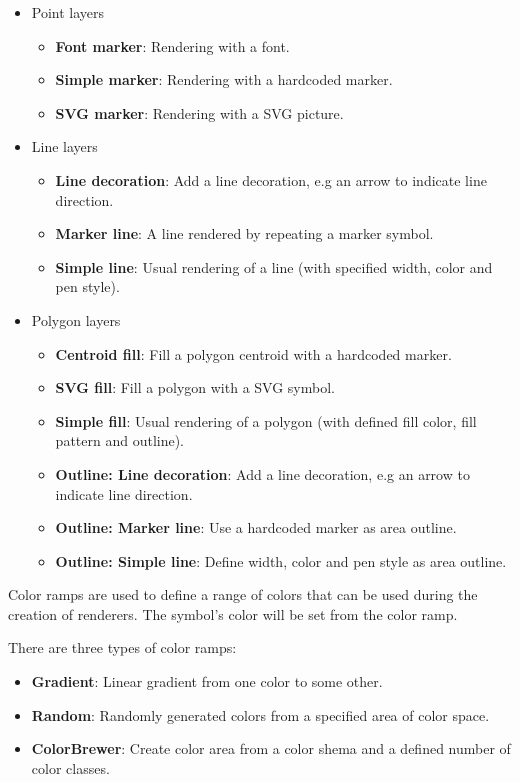 \begin{itemize}[label=--]
\item Point layers
\begin{itemize}[label=--]
\item \textbf{Font marker}: Rendering with a font.
\item \textbf{Simple marker}: Rendering with a hardcoded marker.
\item \textbf{SVG marker}: Rendering with a SVG picture.
\end{itemize}
\item Line layers
\begin{itemize}[label=--]
\item \textbf{Line decoration}: Add a line decoration, e.g an arrow to indicate line direction.
\item \textbf{Marker line}: A line rendered by repeating a marker symbol.
\item \textbf{Simple line}: Usual rendering of a line (with specified width, 
	color and pen style).
\end{itemize}
\item Polygon layers
\begin{itemize}[label=--]
\item \textbf{Centroid fill}: Fill a polygon centroid with a hardcoded marker.
\item \textbf{SVG fill}: Fill a polygon with a SVG symbol. 
\item \textbf{Simple fill}: Usual rendering of a polygon (with defined fill color, 
	fill pattern and outline).
\item \textbf{Outline: Line decoration}: Add a line decoration, e.g an arrow to indicate line direction.
\item \textbf{Outline: Marker line}: Use a hardcoded marker as area outline.
\item \textbf{Outline: Simple line}: Define width, color and pen style as area outline.
\end{itemize}
\end{itemize}


Color ramps are used to define a range of colors that can be used during
the creation of renderers. The symbol's color will be set from the color ramp.

There are three types of color ramps:

\begin{itemize}[label=--]
\item \textbf{Gradient}: Linear gradient from one color to some other.
\item \textbf{Random}: Randomly generated colors from a specified area of
color space.
\item \textbf{ColorBrewer}: Create color area from a color shema and a defined
number of color classes.
\end{itemize}

